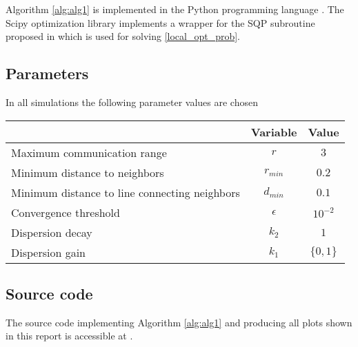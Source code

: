 Algorithm \ref{alg:alg1} is implemented in the Python programming language \cite{python}. The Scipy \cite{2020SciPy-NMeth} optimization library implements a wrapper
for the SQP subroutine proposed in \cite{kraft1988software} which is used for solving \eqref{local_opt_prob}.
\subsection{Parameters}
In all simulations the following parameter values are chosen
\begin{center}
  \begin{tabular}{l|c|c}
     & Variable & Value\\
    \hline
    Maximum communication range & $r$ & $3$\\
    Minimum distance to neighbors & $r_{min}$ & $0.2$\\
    Minimum distance to line connecting neighbors & $d_{min}$ & $0.1$\\
    Convergence threshold & $\epsilon$ & $10^{-2}$\\
    Dispersion decay & $k_{2}$ & $1$\\
    Dispersion gain & $k_{1}$ & $\{0, 1\}$
  \end{tabular}
\end{center}
\subsection{Source code}
The source code implementing Algorithm \ref{alg:alg1} and producing all plots shown in this report is 
accessible at \cite{repo}.